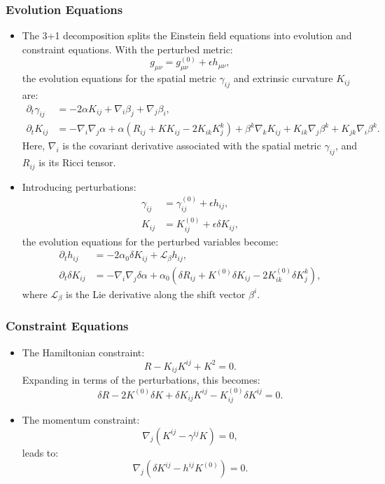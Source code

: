 \documentclass[12pt]{article}
\begin{document}
\subsubsection{Evolution Equations}
\begin{itemize}
    \item The 3+1 decomposition splits the Einstein field equations into evolution and constraint equations. With the perturbed metric:
    \[
    g_{\mu\nu} = g_{\mu\nu}^{(0)} + \epsilon h_{\mu\nu},
    \]
    the evolution equations for the spatial metric $\gamma_{ij}$ and extrinsic curvature $K_{ij}$ are:
    \begin{align}
        \partial_t \gamma_{ij} &= -2\alpha K_{ij} + \nabla_i \beta_j + \nabla_j \beta_i, \\
        \partial_t K_{ij} &= -\nabla_i \nabla_j \alpha + \alpha (R_{ij} + K K_{ij} - 2K_{ik}K^k_j) + \beta^k \nabla_k K_{ij} + K_{ik} \nabla_j \beta^k + K_{jk} \nabla_i \beta^k.
    \end{align}
    Here, $\nabla_i$ is the covariant derivative associated with the spatial metric $\gamma_{ij}$, and $R_{ij}$ is its Ricci tensor.
    \item Introducing perturbations:
    \begin{align*}
        \gamma_{ij} &= \gamma_{ij}^{(0)} + \epsilon h_{ij}, \\
        K_{ij} &= K_{ij}^{(0)} + \epsilon \delta K_{ij},
    \end{align*}
    the evolution equations for the perturbed variables become:
    \begin{align}
        \partial_t h_{ij} &= -2 \alpha_0 \delta K_{ij} + \mathcal{L}_\beta h_{ij}, \\
        \partial_t \delta K_{ij} &= -\nabla_i \nabla_j \delta\alpha + \alpha_0 \left( \delta R_{ij} + K^{(0)} \delta K_{ij} - 2 K_{ik}^{(0)} \delta K^k_j \right),
    \end{align}
    where $\mathcal{L}_\beta$ is the Lie derivative along the shift vector $\beta^i$.

\end{itemize}

\subsubsection{Constraint Equations}
\begin{itemize}
    \item The Hamiltonian constraint:
    \[
    R - K_{ij}K^{ij} + K^2 = 0.
    \]
    Expanding in terms of the perturbations, this becomes:
    \[
    \delta R - 2 K^{(0)} \delta K + \delta K_{ij} K^{ij} - K_{ij}^{(0)} \delta K^{ij} = 0.
    \]
    \item The momentum constraint:
    \[
    \nabla_j (K^{ij} - \gamma^{ij} K) = 0,
    \]
    leads to:
    \[
    \nabla_j (\delta K^{ij} - h^{ij} K^{(0)}) = 0.
    \]
\end{itemize}
\end{document}
